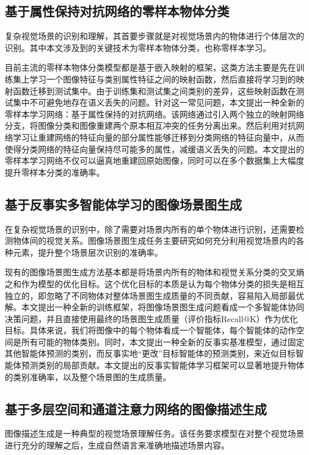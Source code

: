 \subsection{基于属性保持对抗网络的零样本物体分类}
复杂视觉场景的识别和理解，其首要步骤就是对视觉场景内的物体进行个体层次的识别。其中本文涉及到的关键技术为零样本物体分类，也称零样本学习。

目前主流的零样本物体分类模型都是基于嵌入映射的框架，这类方法主要是先在训练集上学习一个图像特征与类别属性特征之间的映射函数，然后直接将学习到的映射函数迁移到测试集中。由于训练集和测试集之间类别的差异，这些映射函数在测试集中不可避免地存在语义丢失的问题。针对这一常见问题，本文提出一种全新的零样本学习网络：基于属性保持的对抗网络。该网络通过引入两个独立的映射网络分支，将图像分类和图像重建两个原本相互冲突的任务分离出来。然后利用对抗网络学习让重建网络的特征向量的部分属性能够迁移到分类网络的特征向量中，从而使得分类网络的特征向量保持尽可能多的属性，减缓语义丢失的问题。本文提出的零样本学习网络不仅可以逼真地重建回原始图像，同时可以在多个数据集上大幅度提升零样本分类的准确率。

\subsection{基于反事实多智能体学习的图像场景图生成}
在复杂视觉场景的识别中，除了需要对场景内所有的单个物体进行识别，还需要检测物体间的视觉关系。图像场景图生成任务主要研究如何充分利用视觉场景内的各种元素，提升整个场景层次识别的准确率。

现有的图像场景图生成方法基本都是将场景内所有的物体和视觉关系分类的交叉熵之和作为模型的优化目标。这个优化目标的本质是认为每个物体分类的损失是相互独立的，即忽略了不同物体对整体场景图生成质量的不同贡献，容易陷入局部最优解。本文提出一种全新的训练框架，将图像场景图生成问题看成一个多智能体协同决策问题，并且直接使用最终的场景图生成质量（评价指标Recall@K）作为优化目标。具体来说，我们将图像中的每个物体看成一个智能体，每个智能体的动作空间是所有可能的物体类别。同时，本文提出一种全新的反事实基准模型，通过固定其他智能体预测的类别，而反事实地“更改”目标智能体的预测类别，来近似目标智能体预测类别的局部贡献。本文提出的反事实智能体学习框架可以显著地提升物体的类别准确率，以及整个场景图的生成质量。


\subsection{基于多层空间和通道注意力网络的图像描述生成}

图像描述生成是一种典型的视觉场景理解任务。该任务要求模型在对整个视觉场景进行充分的理解之后，生成自然语言来准确地描述场景内容。

